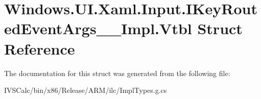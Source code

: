 \hypertarget{struct_windows_1_1_u_i_1_1_xaml_1_1_input_1_1_i_key_routed_event_args_____impl_1_1_vtbl}{}\section{Windows.\+U\+I.\+Xaml.\+Input.\+I\+Key\+Routed\+Event\+Args\+\_\+\+\_\+\+Impl.\+Vtbl Struct Reference}
\label{struct_windows_1_1_u_i_1_1_xaml_1_1_input_1_1_i_key_routed_event_args_____impl_1_1_vtbl}


The documentation for this struct was generated from the following file\+:\begin{DoxyCompactItemize}
\item 
I\+V\+S\+Calc/bin/x86/\+Release/\+A\+R\+M/ilc/Impl\+Types.\+g.\+cs\end{DoxyCompactItemize}
